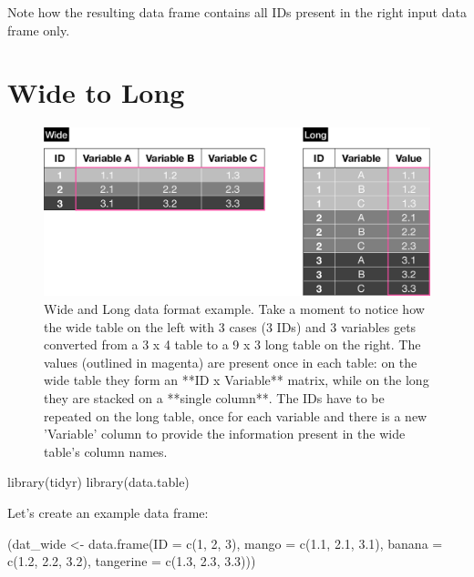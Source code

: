 \documentclass[
]{book}
\newenvironment{Shaded}{\begin{snugshade}}{\end{snugshade}}
\newcommand{\AttributeTok}[1]{\textcolor[rgb]{0.77,0.63,0.00}{#1}}
\newcommand{\DecValTok}[1]{\textcolor[rgb]{0.00,0.00,0.81}{#1}}
\newcommand{\FloatTok}[1]{\textcolor[rgb]{0.00,0.00,0.81}{#1}}
\newcommand{\FunctionTok}[1]{\textcolor[rgb]{0.00,0.00,0.00}{#1}}
\newcommand{\NormalTok}[1]{#1}
\newcommand{\OtherTok}[1]{\textcolor[rgb]{0.56,0.35,0.01}{#1}}
\begin{document}
Note how the resulting data frame contains all IDs present in the right input data frame only.

\hypertarget{wide-to-long}{%
\section{Wide to Long}\label{wide-to-long}}

\begin{figure}

{\centering \includegraphics[width=1\linewidth]{wide_long} 

}

\caption{Wide and Long data format example. Take a moment to notice how the wide table on the left with 3 cases (3 IDs) and 3 variables gets converted from a 3 x 4 table to a 9 x 3 long table on the right. The values (outlined in magenta) are present once in each table: on the wide table they form an **ID x Variable** matrix, while on the long they are stacked on a **single column**. The IDs have to be repeated on the long table, once for each variable and there is a new 'Variable' column to provide the information present in the wide table's column names.}\label{fig:wideLong}
\end{figure}

\begin{Shaded}
\begin{Highlighting}[]
\FunctionTok{library}\NormalTok{(tidyr)}
\FunctionTok{library}\NormalTok{(data.table)}
\end{Highlighting}
\end{Shaded}

Let's create an example data frame:

\begin{Shaded}
\begin{Highlighting}[]
\NormalTok{(dat\_wide }\OtherTok{\textless{}{-}} \FunctionTok{data.frame}\NormalTok{(}\AttributeTok{ID =} \FunctionTok{c}\NormalTok{(}\DecValTok{1}\NormalTok{, }\DecValTok{2}\NormalTok{, }\DecValTok{3}\NormalTok{),}
                       \AttributeTok{mango =} \FunctionTok{c}\NormalTok{(}\FloatTok{1.1}\NormalTok{, }\FloatTok{2.1}\NormalTok{, }\FloatTok{3.1}\NormalTok{),}
                       \AttributeTok{banana =} \FunctionTok{c}\NormalTok{(}\FloatTok{1.2}\NormalTok{, }\FloatTok{2.2}\NormalTok{, }\FloatTok{3.2}\NormalTok{),}
                       \AttributeTok{tangerine =} \FunctionTok{c}\NormalTok{(}\FloatTok{1.3}\NormalTok{, }\FloatTok{2.3}\NormalTok{, }\FloatTok{3.3}\NormalTok{)))}
\end{Highlighting}
\end{Shaded}
\end{document}
